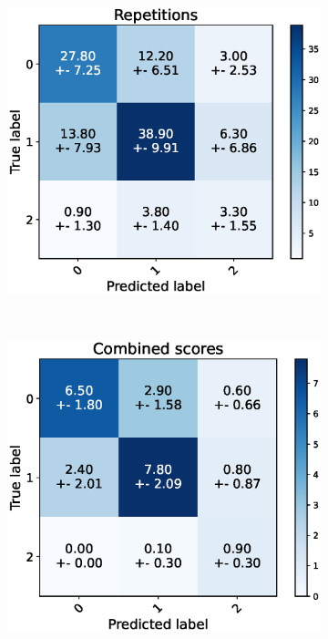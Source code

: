 \begin{figure}
  \centering
  \begin{subfigure}[t]{0.48\textwidth}
      \includegraphics[width=\textwidth]{files/figs/res/pelvis/cnf-reps.eps}
      \caption{}
      \label{fig:pelvis-cnf-reps}
  \end{subfigure}
  ~
  \begin{subfigure}[t]{0.48\textwidth}
      \includegraphics[width=\textwidth]{files/figs/res/pelvis/cnf-combined.eps}
      \caption{}
      \label{fig:pelvis-cnf-comb}
  \end{subfigure}


\end{figure}
